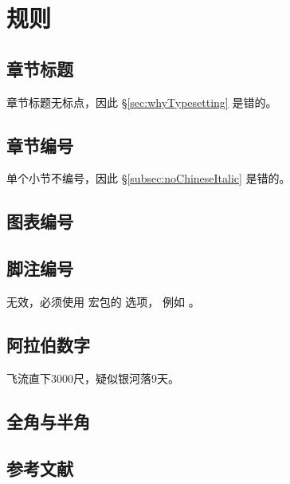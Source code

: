 \chapter{规则}

\section{章节标题}
章节标题无标点，因此 \S \ref{sec:whyTypesetting} 是错的。

\section{章节编号}
单个小节不编号，因此 \S \ref{subsec:noChineseItalic} 是错的。

\section{图表编号}
\section{脚注编号}
\begin{Code}
\end{Code}
无效，必须使用  宏包的  选项，
例如 。

\section{阿拉伯数字}

飞流直下3000尺，疑似银河落9天。

\section{全角与半角}

\section{参考文献}

